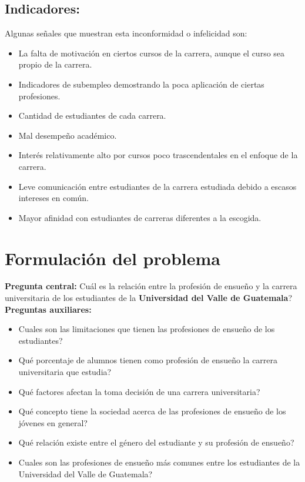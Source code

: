 \subsection{\textbf{Indicadores:}} Algunas se\~{n}ales que muestran esta inconformidad o infelicidad son:
\begin{itemize}
	\item La falta de motivaci\'{o}n en ciertos cursos de la carrera, aunque el curso sea propio de la carrera.
	\item Indicadores de subempleo  demostrando la poca aplicaci\'{o}n de ciertas profesiones.
	\item Cantidad de estudiantes de cada carrera.
	\item Mal desempe\~{n}o acad\'{e}mico.
	\item Inter\'{e}s relativamente alto por cursos poco trascendentales en el enfoque de la carrera.
	\item Leve comunicaci\'{o}n entre estudiantes de la carrera estudiada debido a escasos intereses en com\'{u}n.
	\item Mayor afinidad con estudiantes de carreras diferentes a la escogida.
\end{itemize}

\section{Formulaci\'{o}n del problema}
\textbf{Pregunta central:} \textquestiondown Cu\'{a}l es la relaci\'{o}n entre la profesi\'{o}n de ensue\~{n}o y la carrera universitaria de los estudiantes de la \textbf{Universidad del Valle de Guatemala}?\\

\textbf{Preguntas auxiliares:}
\begin{itemize}
		\item \textquestiondown Cuales son las limitaciones que tienen las profesiones de ensue\~{n}o de los estudiantes?
		\item \textquestiondown Qu\'{e} porcentaje de alumnos tienen como profesi\'{o}n de ensue\~{n}o la carrera universitaria que estudia?
		\item \textquestiondown Qu\'{e} factores afectan la toma decisi\'{o}n de una carrera universitaria?
		\item \textquestiondown Qu\'{e} concepto tiene la sociedad acerca de las profesiones de ensue\~{n}o de los j\'{o}venes en general?
		\item \textquestiondown Qu\'{e} relaci\'{o}n existe entre el g\'{e}nero del estudiante y su profesi\'{o}n de ensue\~{n}o?
		\item \textquestiondown Cuales son las profesiones de ensue\~{n}o m\'{a}s comunes entre los estudiantes de la Universidad del Valle de Guatemala?
\end{itemize}